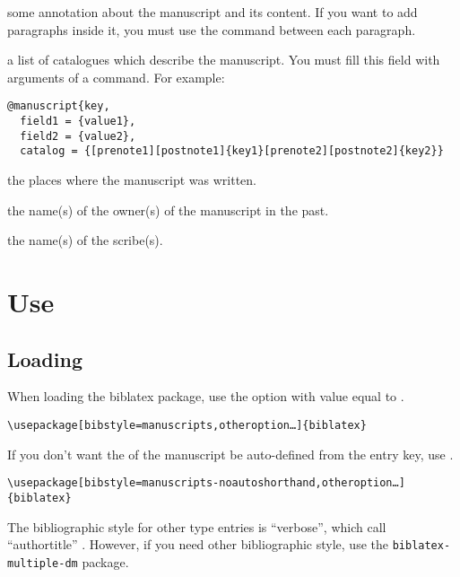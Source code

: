 \documentclass{ltxdockit}[2011/03/25]
\newcommand{\biblatex}{biblatex\xspace}
\begin{document}
\begin{fieldlist}
 some annotation about the manuscript and its content. If you want to add paragraphs inside it, you must use the  command between each paragraph.


 a list of catalogues which describe the manuscript. You must fill this field with arguments of a  command. For example:

\begin{verbatim}
@manuscript{key,
  field1 = {value1},
  field2 = {value2},
  catalog = {[prenote1][postnote1]{key1}[prenote2][postnote2]{key2}}
\end{verbatim}


 the places where the manuscript was written.

 the name(s) of the owner(s) of the manuscript in the past.

 the name(s) of the scribe(s).

\end{fieldlist}

\section{Use}
\subsection{Loading}

When loading the \biblatex package, use the option  with value equal to .

\begin{verbatim}
\usepackage[bibstyle=manuscripts,otheroption…]{biblatex}
\end{verbatim}

\label{noautoshorthand}If you don't want the  of the manuscript be auto-defined from the entry key, use .

\begin{verbatim}
\usepackage[bibstyle=manuscripts-noautoshorthand,otheroption…]{biblatex}
\end{verbatim}

The bibliographic style for other type entries is \enquote{verbose}, which call \enquote{authortitle} . However, if you need other bibliographic style, use the \verb+biblatex-multiple-dm+ package.
\end{document}
